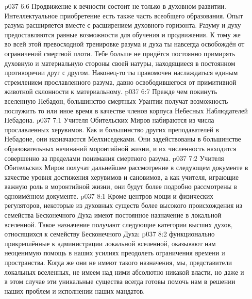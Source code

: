 \vs p037 6:6 Продвижение к вечности состоит не только в духовном развитии. Интеллектуальное приобретение есть также часть всеобщего образования. Опыт разума расширяется вместе с расширением духовного горизонта. Разуму и духу предоставляются равные возможности для обучения и продвижения. К тому же во всей этой превосходной тренировке разума и духа ты навсегда освобождён от ограничений смертной плоти. Тебе больше не придётся постоянно примирять духовную и материальную стороны своей натуры, находящиеся в постоянном противоречии друг с другом. Наконец\hyp{}то ты правомочен наслаждаться единым стремлением прославленного разума, давно освободившегося от примитивной животной склонности к материальному.
\vs p037 6:7 \pc Прежде чем покинуть вселенную Небадон, большинство смертных Урантии получат возможность послужить то или иное время в качестве членов корпуса Небесных Наблюдателей Небадона.
\vs p037 7:1 Учителя Обительских Миров набираются из числа прославленных херувимов. Как и большинство других преподавателей в Небадоне, они назначаются Мелхиседеками. Они задействованы в большинстве образовательных начинаний моронтийной жизни, и их численность находится совершенно за пределами понимания смертного разума.
\vs p037 7:2 Учителя Обительских Миров получат дальнейшее рассмотрение в следующем документе в качестве уровня достижения херувимов и сановимов, а как учителя, играющие важную роль в моронтийной жизни, они будут более подробно рассмотрены в одноимённом документе.
\vs p037 8:1 Кроме центров мощи и физических регуляторов, некоторые из духовных существ более высокого происхождения из семейства Бесконечного Духа имеют постоянное назначение в локальной вселенной. Такое назначение получают следующие категории высших духов, относящихся к семейству Бесконечного Духа:
\vs p037 8:2 \pc {} функционально прикреплённые к администрации локальной вселенной, оказывают нам неоценимую помощь в наших усилиях преодолеть ограничения времени и пространства. Когда же они не имеют такого назначения, мы, представители локальных вселенных, не имеем над ними абсолютно никакой власти, но даже и в этом случае эти уникальные существа всегда готовы помочь нам в решении наших проблем и исполнении наших мандатов.
